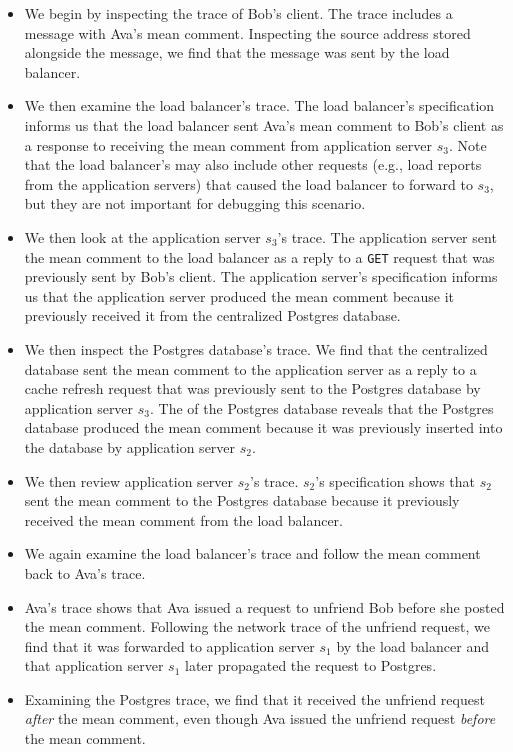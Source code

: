 \begin{itemize}
  \item
    We begin by inspecting the trace of Bob's \systemname{} client. The trace
    includes a message with Ava's mean comment. Inspecting the source address
    stored alongside the message, we find that the message was sent by the load
    balancer.
  \item
    We then examine the load balancer's trace. The load balancer's
    \watprovenance{} specification informs us that the load balancer sent Ava's
    mean comment to Bob's \systemname{} client as a response to receiving the
    mean comment from application server $s_3$. Note that the load balancer's
    \watprovenance{} may also include other requests (e.g., load reports from
    the application servers) that caused the load balancer to forward to $s_3$,
    but they are not important for debugging this scenario.
  \item
    We then look at the application server $s_3$'s trace. The application
    server sent the mean comment to the load balancer as a reply to a
    \texttt{GET} request that was previously sent by Bob's \systemname{}
    client. The application server's \watprovenance{} specification informs us
    that the application server produced the mean comment because it previously
    received it from the centralized Postgres database.
  \item
    We then inspect the Postgres database's trace. We find that the centralized
    database sent the mean comment to the application server as a reply to a
    cache refresh request that was previously sent to the Postgres database by
    application server $s_3$. The \watprovenance{} of the Postgres database
    reveals that the Postgres database produced the mean comment because it was
    previously inserted into the database by application server $s_2$.
  \item
    We then review application server $s_2$'s trace. $s_2$'s \watprovenance{}
    specification shows that $s_2$ sent the mean comment to the Postgres
    database because it previously received the mean comment from the load
    balancer.
  \item
    We again examine the load balancer's trace and follow the mean comment back
    to Ava's \systemname{} trace.
  \item
    Ava's trace shows that Ava issued a request to unfriend Bob before she
    posted the mean comment. Following the network trace of the unfriend
    request, we find that it was forwarded to application server $s_1$ by the
    load balancer and that application server $s_1$ later propagated the
    request to Postgres.
  \item
    Examining the Postgres trace, we find that it received the unfriend request
    \emph{after} the mean comment, even though Ava issued the unfriend request
    \emph{before} the mean comment.
\end{itemize}

